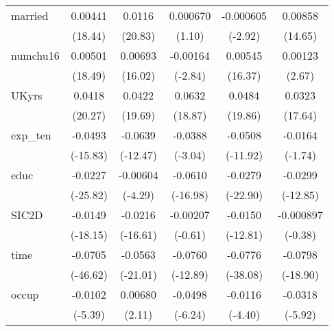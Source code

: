 \begin{table}[htbp]
\begin{tabular}{l*{5}{c}}
married     &     0.00441\sym{***}&      0.0116\sym{***}&    0.000670         &   -0.000605\sym{**} &     0.00858\sym{***}\\
            &     (18.44)         &     (20.83)         &      (1.10)         &     (-2.92)         &     (14.65)         \\
numchu16    &     0.00501\sym{***}&     0.00693\sym{***}&    -0.00164\sym{**} &     0.00545\sym{***}&     0.00123\sym{**} \\
            &     (18.49)         &     (16.02)         &     (-2.84)         &     (16.37)         &      (2.67)         \\
UKyrs       &      0.0418\sym{***}&      0.0422\sym{***}&      0.0632\sym{***}&      0.0484\sym{***}&      0.0323\sym{***}\\
            &     (20.27)         &     (19.69)         &     (18.87)         &     (19.86)         &     (17.64)         \\
exp\_ten     &     -0.0493\sym{***}&     -0.0639\sym{***}&     -0.0388\sym{**} &     -0.0508\sym{***}&     -0.0164         \\
            &    (-15.83)         &    (-12.47)         &     (-3.04)         &    (-11.92)         &     (-1.74)         \\
educ        &     -0.0227\sym{***}&    -0.00604\sym{***}&     -0.0610\sym{***}&     -0.0279\sym{***}&     -0.0299\sym{***}\\
            &    (-25.82)         &     (-4.29)         &    (-16.98)         &    (-22.90)         &    (-12.85)         \\
SIC2D       &     -0.0149\sym{***}&     -0.0216\sym{***}&    -0.00207         &     -0.0150\sym{***}&   -0.000897         \\
            &    (-18.15)         &    (-16.61)         &     (-0.61)         &    (-12.81)         &     (-0.38)         \\
time        &     -0.0705\sym{***}&     -0.0563\sym{***}&     -0.0760\sym{***}&     -0.0776\sym{***}&     -0.0798\sym{***}\\
            &    (-46.62)         &    (-21.01)         &    (-12.89)         &    (-38.08)         &    (-18.90)         \\
occup       &     -0.0102\sym{***}&     0.00680\sym{*}  &     -0.0498\sym{***}&     -0.0116\sym{***}&     -0.0318\sym{***}\\
            &     (-5.39)         &      (2.11)         &     (-6.24)         &     (-4.40)         &     (-5.92)         \\

\end{tabular}
\end{table}
